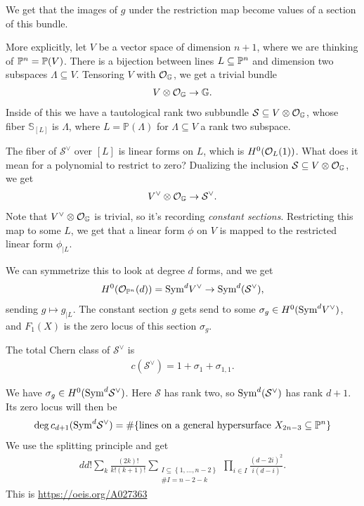 \documentclass[11pt]{amsart}
\begin{document}
We get that the images of $g$ under the restriction map become values of a section of this bundle.

More explicitly, let $V$ be a vector space of dimension $n+1$, where we are thinking of $\P^n = \mathbb{P}(V)$. There is a bijection between lines $L \subseteq \P^n$ and dimension two subspaces $\Lambda \subseteq V$. Tensoring $V$ with $\O_\mathbb{G}$, we get a trivial bundle
\begin{align*}
    V \otimes\O_\mathbb{G} \to \mathbb{G}.
\end{align*}
Inside of this we have a tautological rank two subbundle $\mathcal{S} \subseteq V \otimes \O_\mathbb{G}$, whose fiber $\mathbb{S}_{[L]}$ is $\Lambda$, where $L = \mathbb{P}(\Lambda)$ for $\Lambda \subseteq V$ a rank two subspace.

The fiber of $\mathcal{S}^\vee$ over $[L]$ is linear forms on $L$, which is $H^0(\O_L(1))$. What does it mean for a polynomial to restrict to zero? Dualizing the inclusion $\mathcal{S} \subseteq V \otimes \O_\mathbb{G}$, we get
\begin{align*}
    V^\vee \otimes \O_{\mathbb{G}} \to \mathcal{S}^\vee.
\end{align*}
Note that $V^\vee \otimes \O_\mathbb{G}$ is trivial, so it's recording \textit{constant sections}. Restricting this map to some $L$, we get that a linear form $\phi$ on $V$ is mapped to the restricted linear form $\phi_{|L}$.

We can symmetrize this to look at degree $d$ forms, and we get
\begin{align*}
    H^0(\O_{\P^n}(d)) = \Sym^d V^\vee \to \Sym^d(\mathcal{S}^\vee),
\end{align*}
sending $g \mapsto g_{|L}$. The constant section $g$ gets send to some $\sigma_g \in H^0(\Sym^d V^\vee)$, and $F_1(X)$ is the zero locus of this section $\sigma_g$.

\begin{proposition} The total Chern class of $\mathcal{S}^\vee$ is
\begin{align*}
    c(\mathcal{S}^\vee) = 1 + \sigma_1 + \sigma_{1,1}.
\end{align*}
\end{proposition}

We have $\sigma_g \in H^0(\Sym^d \mathcal{S}^\vee)$. Here $\mathcal{S}$ has rank two, so $\Sym^d(\mathcal{S}^\vee)$ has rank $d+1$. Its zero locus will then be
\begin{align*}
    \deg c_{d+1}(\Sym^d \mathcal{S}^\vee) = \#\{\text{lines on a general hypersurface } X_{2n-3} \subseteq \P^n\}
\end{align*}
%
We use the splitting principle and get
\begin{align*}
    d d! \sum_k \frac{(2k)!}{k! (k+1)!}\sum_{\substack{I \subseteq \left\{ 1, \ldots, n-2 \right\} \\ \#I = n-2-k}} \prod_{i\in I} \frac{(d-2i)^2}{i(d-i)}.
\end{align*}
This is \url{https://oeis.org/A027363}
\end{document}
